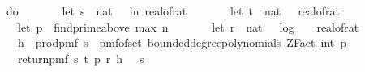 \begin{isabellebody}
\ \ \ \ do\ {\isacharbraceleft}{\kern0pt}\isanewline
\ \ \ \ \ \ let\ s\ {\isacharequal}{\kern0pt}\ nat\ {\isasymlceil}{\isacharminus}{\kern0pt}{}{}\ {\isacharasterisk}{\kern0pt}\ ln\ {\isacharparenleft}{\kern0pt}real{\isacharunderscore}{\kern0pt}of{\isacharunderscore}{\kern0pt}rat\ {\isasymepsilon}{\isacharparenright}{\kern0pt}{\isasymrceil}{\isacharsemicolon}{\kern0pt}\isanewline
\ \ \ \ \ \ let\ t\ {\isacharequal}{\kern0pt}\ nat\ {\isasymlceil}{}{}\ {\isacharslash}{\kern0pt}\ {\isacharparenleft}{\kern0pt}real{\isacharunderscore}{\kern0pt}of{\isacharunderscore}{\kern0pt}rat\ {\isasymdelta}{\isacharparenright}{\kern0pt}\isanewline
\ \ \ \ \ \ let\ p\ {\isacharequal}{\kern0pt}\ find{\isacharunderscore}{\kern0pt}prime{\isacharunderscore}{\kern0pt}above\ {\isacharparenleft}{\kern0pt}max\ n\ {}{}{\isacharparenright}{\kern0pt}{\isacharsemicolon}{\kern0pt}\isanewline
\ \ \ \ \ \ let\ r\ {\isacharequal}{\kern0pt}\ nat\ {\isacharparenleft}{\kern0pt}{}\ {\isacharasterisk}{\kern0pt}\ {\isasymlceil}log\ {}\ {\isacharparenleft}{\kern0pt}{}\ {\isacharslash}{\kern0pt}\ real{\isacharunderscore}{\kern0pt}of{\isacharunderscore}{\kern0pt}rat\ {\isasymdelta}{\isacharparenright}{\kern0pt}{\isasymrceil}\ {\isacharplus}{\kern0pt}\ {}{}{\isacharparenright}{\kern0pt}{\isacharsemicolon}{\kern0pt}\ \isanewline
\ \ \ \ \ \ h\ {\isasymleftarrow}\ prod{\isacharunderscore}{\kern0pt}pmf\ {\isacharbraceleft}{\kern0pt}{}{\isachardot}{\kern0pt}{\isachardot}{\kern0pt}{\isacharless}{\kern0pt}s{\isacharbraceright}{\kern0pt}\ {\isacharparenleft}{\kern0pt}{\isasymlambda}{\isacharunderscore}{\kern0pt}{\isachardot}{\kern0pt}\ pmf{\isacharunderscore}{\kern0pt}of{\isacharunderscore}{\kern0pt}set\ {\isacharparenleft}{\kern0pt}bounded{\isacharunderscore}{\kern0pt}degree{\isacharunderscore}{\kern0pt}polynomials\ {\isacharparenleft}{\kern0pt}ZFact\ {\isacharparenleft}{\kern0pt}int\ p{\isacharparenright}{\kern0pt}{\isacharparenright}{\kern0pt}\ {}{\isacharparenright}{\kern0pt}{\isacharparenright}{\kern0pt}{\isacharsemicolon}{\kern0pt}\isanewline
\ \ \ \ \ \ return{\isacharunderscore}{\kern0pt}pmf\ {\isacharparenleft}{\kern0pt}s{\isacharcomma}{\kern0pt}\ t{\isacharcomma}{\kern0pt}\ p{\isacharcomma}{\kern0pt}\ r{\isacharcomma}{\kern0pt}\ h{\isacharcomma}{\kern0pt}\ {\isacharparenleft}{\kern0pt}{\isasymlambda}{\isacharunderscore}{\kern0pt}\ {\isasymin}\ {\isacharbraceleft}{\kern0pt}{}{\isachardot}{\kern0pt}{\isachardot}{\kern0pt}{\isacharless}{\kern0pt}s{\isacharbraceright}{\kern0pt}{\isachardot}{\kern0pt}\ {\isacharbraceleft}{\kern0pt}{\isacharbraceright}{\kern0pt}{\isacharparenright}{\kern0pt}{\isacharparenright}{\kern0pt}\isanewline

\end{isabellebody}
